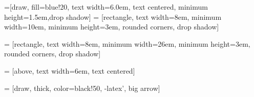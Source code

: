 \usetikzlibrary{shadows,arrows}
\usetikzlibrary{decorations.markings}


=[draw, fill=blue!20, text width=6.0em, text centered,
  minimum height=1.5em,drop shadow]
 = [rectangle, text width=8em, minimum width=10em,
  minimum height=3em, rounded corners, drop shadow]

 = [rectangle, text width=8em, minimum width=26em,
  minimum height=3em, rounded corners, drop shadow]

 = [above, text width=6em, text centered]

 = [draw, thick, color=black!50, -latex', big arrow]

\newcommand{\practica}[2]{node (p#1) [practica] {#2}}
\newcommand{\longhorse}[2]{node (p#1) [long] {#2}}
\newcommand{\implemented}[2]{node (p#1) [interface] {#2}}
 
\newcommand{\backgroundDB}[5]{%
  \begin{pgfonlayer}{background}
    \path (#1.west |- #2.north)+(-0.5,0.5) node (a1) {};
    \path (#3.east |- #4.south)+(+0.5,-0.25) node (a2) {};
    \path[fill=green!20,rounded corners, draw=black!50, dashed]
      (a1) rectangle (a2);
    \path (a1.east |- a1.south)+(0.8,-0.3) node (u1)[texto]
      {\scriptsize\textit{#5}};
  \end{pgfonlayer}}
\newcommand{\background}[5]{%
  \begin{pgfonlayer}{background}
    \path (#1.west |- #2.north)+(-1.0,1.0) node (a1) {};
    \path (#3.east |- #4.south)+(+1.0,-1.00) node (a2) {};
    \path[fill=yellow!20,rounded corners, draw=black!50, dashed]
      (a1) rectangle (a2);
    \path (a1.east |- a1.south)+(0.8,-0.3) node (u1)[texto]
    {\scriptsize\textit{#5}};
  \end{pgfonlayer}} 

